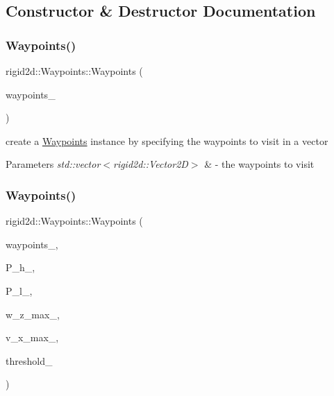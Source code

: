 \subsection{Constructor \& Destructor Documentation}
\mbox{\label{classrigid2d_1_1Waypoints_a2d80cabdd52bc5291ddab198be441618}} 
\subsubsection{\texorpdfstring{Waypoints()}{Waypoints()}\hspace{0.1cm}{\footnotesize\ttfamily [1/2]}}
{\footnotesize\ttfamily rigid2d\+::\+Waypoints\+::\+Waypoints (\begin{DoxyParamCaption}\item[{const std\+::vector$<$ \hyperlink{structrigid2d_1_1Vector2D}{Vector2D} $>$ \&}]{waypoints\+\_\+ }\end{DoxyParamCaption})}



create a \hyperlink{classrigid2d_1_1Waypoints}{Waypoints} instance by specifying the waypoints to visit in a vector 


\begin{DoxyParams}{Parameters}
{\em std\+::vector$<$rigid2d\+::\+Vector2\+D$>$} & -\/ the waypoints to visit \\
\hline
\end{DoxyParams}
\mbox{\label{classrigid2d_1_1Waypoints_a45bc2c3d9687047b403d08f14456961e}} 
\subsubsection{\texorpdfstring{Waypoints()}{Waypoints()}\hspace{0.1cm}{\footnotesize\ttfamily [2/2]}}
{\footnotesize\ttfamily rigid2d\+::\+Waypoints\+::\+Waypoints (\begin{DoxyParamCaption}\item[{const std\+::vector$<$ \hyperlink{structrigid2d_1_1Vector2D}{Vector2D} $>$ \&}]{waypoints\+\_\+,  }\item[{const double \&}]{P\+\_\+h\+\_\+,  }\item[{const double \&}]{P\+\_\+l\+\_\+,  }\item[{const double \&}]{w\+\_\+z\+\_\+max\+\_\+,  }\item[{const double \&}]{v\+\_\+x\+\_\+max\+\_\+,  }\item[{const double \&}]{threshold\+\_\+ }\end{DoxyParamCaption})}



